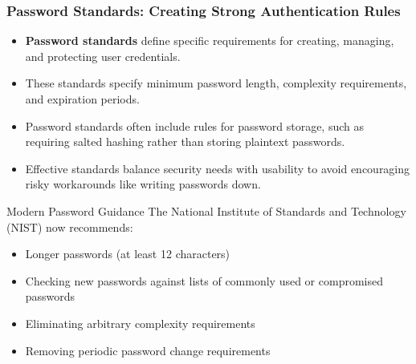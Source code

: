 \documentclass{beamer}
\begin{document}
\begin{frame}
\frametitle{Password Standards: Creating Strong Authentication Rules}
\begin{itemize}
\item \textbf{Password standards} define specific requirements for creating, managing, and protecting user credentials.
\item These standards specify minimum password length, complexity requirements, and expiration periods.
\item Password standards often include rules for password storage, such as requiring salted hashing rather than storing plaintext passwords.
\item Effective standards balance security needs with usability to avoid encouraging risky workarounds like writing passwords down.
\end{itemize}

\begin{alertblock}{Modern Password Guidance}
\scriptsize
The National Institute of Standards and Technology (NIST) now recommends:
\begin{itemize}
\item Longer passwords (at least 12 characters)
\item Checking new passwords against lists of commonly used or compromised passwords
\item Eliminating arbitrary complexity requirements
\item Removing periodic password change requirements
\end{itemize}
\end{alertblock}
\end{frame}
\end{document}
